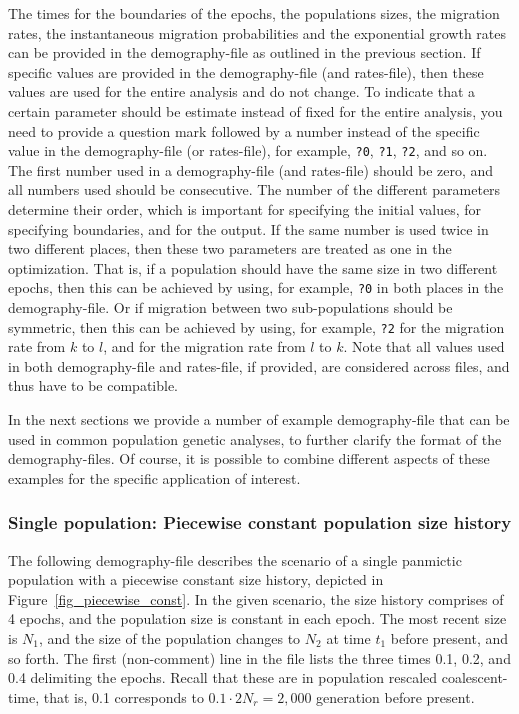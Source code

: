 \documentclass{article}
\numberwithin{equation}{section}
\begin{document}
The times for the boundaries of the epochs, the populations sizes, the migration rates, the instantaneous migration probabilities and the exponential growth rates can be provided in the demography-file as outlined in the previous section. If specific values are provided in the demography-file (and rates-file), then these values are used for the entire analysis and do not change. To indicate that a certain parameter should be estimate instead of fixed for the entire analysis, you need to provide a question mark followed by a number instead of the specific value in the demography-file (or rates-file), for example, \texttt{?0}, \texttt{?1}, \texttt{?2}, and so on. The first number used in a demography-file (and rates-file) should be zero, and all numbers used should be consecutive. The number of the different parameters determine their order, which is important for specifying the initial values, for specifying boundaries, and for the output. If the same number is used twice in two different places, then these two parameters are treated as one in the optimization. That is, if a population should have the same size in two different epochs, then this can be achieved by using, for example, \texttt{?0} in both places in the demography-file. Or if migration between two sub-populations should be symmetric, then this can be achieved by using, for example, \texttt{?2} for the migration rate from $k$ to $l$, and for the migration rate from $l$ to $k$. Note that all values used in both demography-file and rates-file, if provided, are considered across files, and thus have to be compatible.

In the next sections we provide a number of example demography-file that can be used in common population genetic analyses, to further clarify the format of the demography-files. Of course, it is possible to combine different aspects of these examples for the specific application of interest.

\subsubsection{Single population: Piecewise constant population size history} 
\label{sec_demo_piecewise_constant}


The following demography-file describes the scenario of a single panmictic population with a piecewise constant size history, depicted in Figure~\ref{fig_piecewise_const}. In the given scenario, the size history comprises of 4 epochs, and the population size is constant in each epoch. The most recent size is $N_1$, and the size of the population changes to $N_2$ at time $t_1$ before present, and so forth. The first (non-comment) line in the file lists the three times 0.1, 0.2, and 0.4 delimiting the epochs. Recall that these are in population rescaled coalescent-time, that is, 0.1 corresponds to $0.1 \cdot 2 N_r = 2,000$ generation before present.
\end{document}
